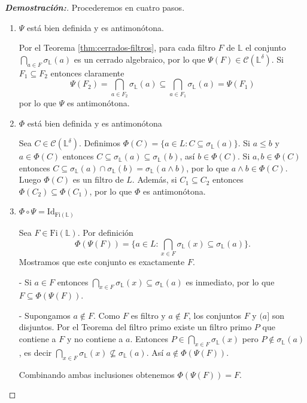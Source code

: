 \documentclass[12pt]{book}
\newcommand{\Id}{\mathrm{Id}}
\begin{document}
\begin{proof}[\textbf{Demostración:}]
Procederemos en cuatro pasos.

\begin{enumerate}
\item $\Psi$ está bien definida y es antimonótona.

Por el Teorema \ref{thm:cerrados-filtros}, para cada filtro \(F\) de \(\mathbb L\) el conjunto
\(\bigcap_{a\in F}\sigma_{\mathbb{L}}(a)\) es un cerrado algebraico, por lo que \(\Psi(F)\in\mathcal C(\mathbb L^\delta)\).
Si \(F_1\subseteq F_2\) entonces claramente
\[\Psi(F_2)=\bigcap_{a\in F_2}\sigma_{\mathbb{L}}(a)\subseteq\bigcap_{a\in F_1}\sigma_{\mathbb{L}}(a)=\Psi(F_1)\]
por lo que \(\Psi\) es antimonótona.

\item $\Phi$ está bien definida y es antimonótona

Sea \(C\in\mathcal C(\mathbb L^\delta)\). Definimos
\(\Phi(C)=\{a\in L : C\subseteq\sigma_{\mathbb{L}}(a)\}\). Si \(a\le b\) y \(a\in\Phi(C)\)
entonces \(C\subseteq\sigma_{\mathbb{L}}(a)\subseteq\sigma_{\mathbb{L}}(b)\), así \(b\in\Phi(C)\). Si
\(a,b\in\Phi(C)\) entonces \(C\subseteq\sigma_{\mathbb{L}}(a)\cap\sigma_{\mathbb{L}}(b)=\sigma_{\mathbb{L}}(a\wedge b)\),
por lo que \(a\wedge b\in\Phi(C)\). Luego \(\Phi(C)\) es un filtro de \(L\).
Además, si \(C_1\subseteq C_2\) entonces \(\Phi(C_2)\subseteq\Phi(C_1)\),
por lo que \(\Phi\) es antimonótona.

\item $\Phi\circ\Psi=\Id_{\mathrm{Fi}(\mathbb{L})}$

Sea \(F\in\mathrm{Fi}(\mathbb L)\). Por definición
\[
\Phi(\Psi(F))
=\{a\in L:\bigcap_{x\in F}\sigma_{\mathbb{L}}(x)\subseteq\sigma_{\mathbb{L}}(a)\}.
\]
Mostramos que este conjunto es exactamente \(F\).

- Si \(a\in F\) entonces \(\bigcap_{x\in F}\sigma_{\mathbb{L}}(x)\subseteq\sigma_{\mathbb{L}}(a)\) es inmediato, por lo que
  \(F\subseteq \Phi(\Psi(F))\).

- Supongamos \(a\notin F\). Como \(F\) es filtro y \(a\notin F\), los conjuntos \(F\) y \((a]\)
  son disjuntos. Por el Teorema del filtro primo existe un filtro primo \(P\) que contiene a \(F\)
  y no contiene a \(a\). Entonces \(P\in\bigcap_{x\in F}\sigma_{\mathbb{L}}(x)\) pero \(P\notin\sigma_{\mathbb{L}}(a)\),
  es decir \(\bigcap_{x\in F}\sigma_{\mathbb{L}}(x)\not\subseteq\sigma_{\mathbb{L}}(a)\). Así \(a\notin\Phi(\Psi(F))\).

Combinando ambas inclusiones obtenemos \(\Phi(\Psi(F))=F\).


\end{enumerate}
\end{proof}
\end{document}
